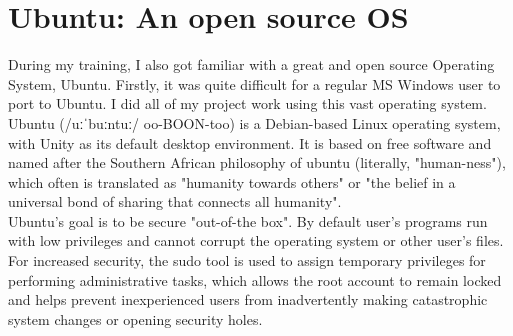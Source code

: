 \section{Ubuntu: An open source OS}
During my training, I also got familiar with a great and open source Operating System, Ubuntu. Firstly, it was quite difficult for a regular MS Windows user to port to Ubuntu. I did all of my project work using this vast operating system. 
Ubuntu (/uːˈbuːntuː/ oo-BOON-too) is a Debian-based Linux operating system, with Unity as its default desktop environment. It is based on free software and named after the Southern African philosophy of ubuntu (literally, "human-ness"), which often is translated as "humanity towards others" or "the belief in a universal bond of sharing that connects all humanity".\\

Ubuntu's goal is to be secure "out-of-the box". By default user's programs run with low privileges and cannot corrupt the operating system or other user's files. For increased security, the sudo tool is used to assign temporary privileges for performing administrative tasks, which allows the root account to remain locked and helps prevent inexperienced users from inadvertently making catastrophic system changes or opening security holes.\\
